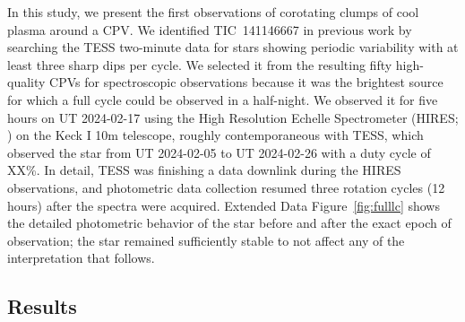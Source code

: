 \documentclass{nature3}
\begin{document}
In this study, we present the first observations of corotating clumps
of cool plasma around a CPV.  We identified TIC~141146667 in previous
work \cite{Bouma2024} by searching the TESS two-minute data for stars
showing periodic variability with at least three sharp dips per cycle.  We
selected it from the resulting fifty high-quality CPVs for
spectroscopic observations because it was the brightest source for
which a full cycle could be observed in a half-night.  We observed it
for five hours on UT 2024-02-17 using the High Resolution Echelle
Spectrometer (HIRES; \cite{vogt_hires_1994}) on the Keck I 10m
telescope, roughly contemporaneous with TESS, which observed the star
from UT 2024-02-05 to UT 2024-02-26 with a duty cycle of XX\%.  In
detail, TESS was finishing a data downlink during the HIRES
observations, and photometric data collection resumed three rotation cycles
(12 hours) after the spectra were acquired.  Extended Data
Figure~\ref{fig:fulllc} shows the detailed photometric behavior of the
star before and after the exact epoch of observation; the star
remained sufficiently stable to not affect any of the interpretation
that follows.


\subsection{Results}
\end{document}
